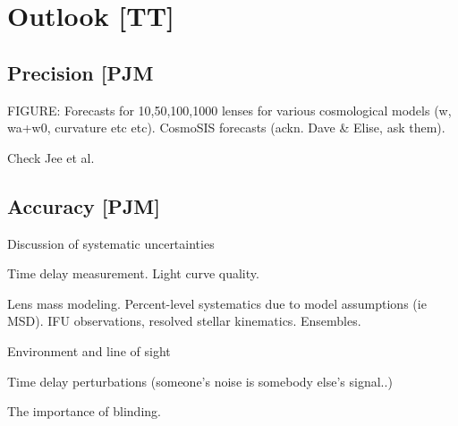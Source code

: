 



\section{Outlook [TT]}
\label{sec:cosmo}



\subsection{Precision [PJM}

FIGURE: Forecasts for 10,50,100,1000 lenses for various cosmological models (w, wa+w0, curvature etc etc). CosmoSIS forecasts (ackn. Dave \& Elise, ask them). 

Check Jee et al.




\subsection{Accuracy [PJM]}



Discussion of systematic uncertainties

Time delay measurement. Light curve quality. 

Lens mass modeling. Percent-level systematics due to model assumptions (ie MSD). IFU observations, resolved stellar kinematics. Ensembles. 

Environment and line of sight

Time delay perturbations (someone's noise is somebody else's signal..)

The importance of blinding.

